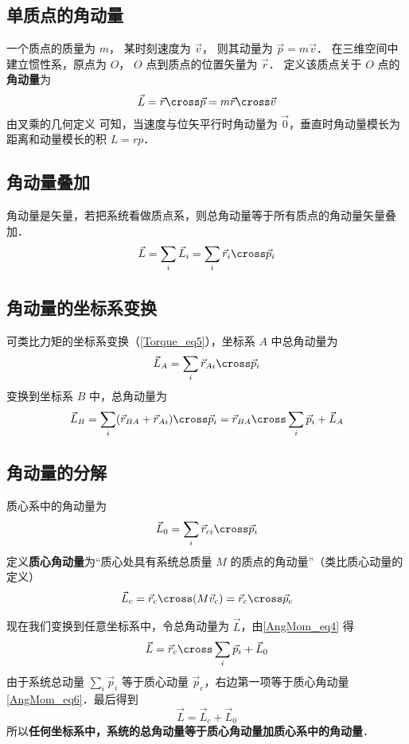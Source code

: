 

\subsection{单质点的角动量}
一个质点的质量为 $m$， 某时刻速度为 $\vec v$， 则其动量为 $\vec p = m\vec v$． 在三维空间中建立惯性系，原点为 $O$， $O$ 点到质点的位置矢量为 $\vec r$． 定义该质点关于 $O$ 点的\textbf{角动量}为
\begin{equation}
\vec L = \vec r \cross \vec p = m\vec r\cross \vec v
\end{equation}
由叉乘的几何定义 可知，当速度与位矢平行时角动量为 $\vec 0$，垂直时角动量模长为距离和动量模长的积 $L = rp$．

\subsection{角动量叠加}
角动量是矢量，若把系统看做质点系，则总角动量等于所有质点的角动量矢量叠加．
\begin{equation}
\vec L = \sum_i \vec L_i = \sum_i \vec r_i \cross\vec p_i
\end{equation}

\subsection{角动量的坐标系变换}
可类比力矩的坐标系变换（\autoref{Torque_eq5}），坐标系 $A$ 中总角动量为
\begin{equation}
\vec L_A = \sum_i \vec r_{Ai} \cross\vec p_i 
\end{equation}
变换到坐标系 $B$ 中，总角动量为
\begin{equation}\label{AngMom_eq4}
\vec L_B = \sum_i (\vec r_{BA} + \vec r_{Ai})\cross \vec p_i = \vec r_{BA}\cross \sum_i \vec p_i + \vec L_A
\end{equation}

\subsection{角动量的分解}
质心系中的角动量为
\begin{equation}\label{AngMom_eq5}
\vec L_0 = \sum_i \vec r_{ci}\cross \vec p_i
\end{equation}
定义\textbf{质心角动量}为“质心处具有系统总质量 $M$ 的质点的角动量”（类比质心动量的定义）%
\begin{equation}\label{AngMom_eq6}
\vec L_c  = \vec r_c \cross (M \vec v_c) = \vec r_c\cross\vec p_c
\end{equation}

现在我们变换到任意坐标系中，令总角动量为 $\vec L$，由\autoref{AngMom_eq4} 得
\begin{equation}
\vec L = \vec r_{c}\cross \sum_i \vec p_i + \vec L_0
\end{equation}
由于系统总动量 $\sum_i \vec p_i$ 等于质心动量 $\vec p_c$，右边第一项等于质心角动量\autoref{AngMom_eq6}．最后得到
\begin{equation}
\vec L = \vec L_c + \vec L_0
\end{equation}
所以\textbf{任何坐标系中，系统的总角动量等于质心角动量加质心系中的角动量}．
